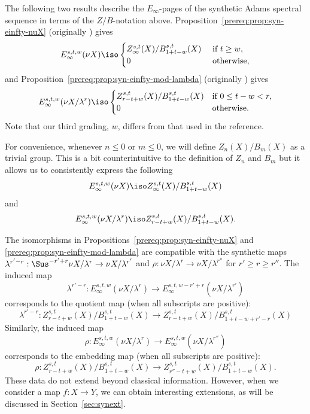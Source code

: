 The following two results describe the $E_\infty$-pages of the synthetic Adams spectral sequence in terms of the $Z/B$-notation above. Proposition~\ref{prereq:prop:syn-einfty-nuX} (originally \cite[Corollary A.9]{BHS}) gives
$$E_\infty^{s,t,w}(\nu X)\iso\begin{cases}
    Z_\infty^{s,t}(X)/B_{1+t-w}^{s,t}(X) & \text{ if } t \ge w,\\
    0 & \text{ otherwise},
\end{cases}$$
and Proposition~\ref{prereq:prop:syn-einfty-mod-lambda} (originally \cite[Corollary A.11]{BHS}) gives
$$E_\infty^{s,t,w}(\nu X/\lambda^r)\iso\begin{cases}
    Z_{r-t+w}^{s,t}(X)/B_{1+t-w}^{s,t}(X) & \text{if } 0\le t-w < r,\\
    0 & \text{otherwise}.
\end{cases}$$
Note that our third grading, $w$, differs from that used in the reference.

\begin{notation}
    For convenience, whenever $n\le 0$ or $m\le 0$, we will define $Z_n(X)/B_m(X)$ as a trivial group. This is a bit counterintuitive to the definition of $Z_n$ and $B_m$ but it allows us to consistently express the following
    $$E_\infty^{s,t,w}(\nu X)\iso Z_\infty^{s,t}(X)/B_{1+t-w}^{s,t}(X)$$
    and
    $$E_\infty^{s,t,w}(\nu X/\lambda^r)\iso Z_{r-t+w}^{s,t}(X)/B_{1+t-w}^{s,t}(X).$$
\end{notation}


\begin{remark}
    The isomorphisms in Propositions~\ref{prereq:prop:syn-einfty-nuX} and \ref{prereq:prop:syn-einfty-mod-lambda} are compatible with the synthetic maps $\lambda^{r'-r}: \Sus^{-r'+r}\nu X/\lambda^r\to \nu X/\lambda^{r'}$ and $\rho: \nu X/\lambda^r\to \nu X/\lambda^{r''}$ for $r'\ge r\ge r''$. The induced map
    $$\lambda^{r'-r}:E_\infty^{s,t,w}(\nu X/\lambda^r)\to E_\infty^{s,t,w-r'+r}(\nu X/\lambda^{r'})$$
    corresponds to the quotient map (when all subscripts are positive):
    $$\lambda^{r'-r}:Z_{r-t+w}^{s,t}(X)/B_{1+t-w}^{s,t}(X)\to Z_{r-t+w}^{s,t}(X)/B_{1+t-w+r'-r}^{s,t}(X)$$
    Similarly, the induced map
    $$\rho:E_\infty^{s,t,w}(\nu X/\lambda^r)\to E_\infty^{s,t,w}(\nu X/\lambda^{r''})$$
    corresponds to the embedding map (when all subscripts are positive):
    $$\rho:Z_{r-t+w}^{s,t}(X)/B_{1+t-w}^{s,t}(X)\to Z_{r''-t+w}^{s,t}(X)/B_{1+t-w}^{s,t}(X).$$
    These data do not extend beyond classical information. However, when we consider a map $f: X\to Y$, we can obtain interesting extensions, as will be discussed in Section~\ref{sec:synext}.
\end{remark}

